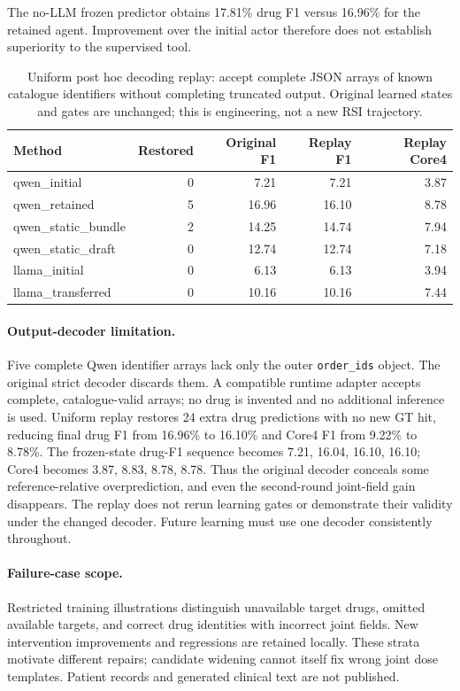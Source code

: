 The no-LLM frozen predictor obtains 17.81\% drug F1 versus 16.96\% for the retained agent. Improvement over the initial actor therefore does not establish superiority to the supervised tool.
\begin{table}[t]\centering\small
\setlength{\tabcolsep}{4pt}
\caption{Uniform post hoc decoding replay: accept complete JSON arrays of known catalogue identifiers without completing truncated output. Original learned states and gates are unchanged; this is engineering, not a new RSI trajectory.}
\label{tab:decodercompat}
\begin{tabular}{@{}lrrrr@{}}\toprule
Method & Restored & Original F1 & Replay F1 & Replay Core4\\\midrule
qwen\_initial & 0 & 7.21 & 7.21 & 3.87\\
qwen\_retained & 5 & 16.96 & 16.10 & 8.78\\
qwen\_static\_bundle & 2 & 14.25 & 14.74 & 7.94\\
qwen\_static\_draft & 0 & 12.74 & 12.74 & 7.18\\
llama\_initial & 0 & 6.13 & 6.13 & 3.94\\
llama\_transferred & 0 & 10.16 & 10.16 & 7.44\\
\bottomrule\end{tabular}
\end{table}\paragraph{Output-decoder limitation.} Five complete Qwen identifier arrays lack only the outer \texttt{order\_ids} object. The original strict decoder discards them. A compatible runtime adapter accepts complete, catalogue-valid arrays; no drug is invented and no additional inference is used. Uniform replay restores 24 extra drug predictions with no new GT hit, reducing final drug F1 from 16.96\% to 16.10\% and Core4 F1 from 9.22\% to 8.78\%. The frozen-state drug-F1 sequence becomes 7.21, 16.04, 16.10, 16.10; Core4 becomes 3.87, 8.83, 8.78, 8.78. Thus the original decoder conceals some reference-relative overprediction, and even the second-round joint-field gain disappears. The replay does not rerun learning gates or demonstrate their validity under the changed decoder. Future learning must use one decoder consistently throughout.
\paragraph{Failure-case scope.} Restricted training illustrations distinguish unavailable target drugs, omitted available targets, and correct drug identities with incorrect joint fields. New intervention improvements and regressions are retained locally. These strata motivate different repairs; candidate widening cannot itself fix wrong joint dose templates. Patient records and generated clinical text are not published.


